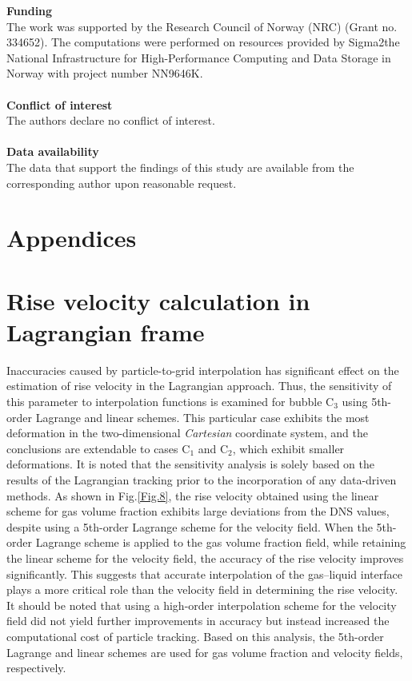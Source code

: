 \documentclass[a4paper,fleqn]{cas-sc}
\begin{document}
	
	{\noindent \bf{Funding}} \\
	
	The work was supported by the Research Council of Norway (NRC) (Grant no. 334652). The computations were performed on resources provided by Sigma2\textemdash the National Infrastructure for High-Performance Computing and Data Storage in Norway with project number NN9646K.\\
	\\
	{\bf{Conflict of interest}} \\
	
	The authors declare no conflict of interest. \\
	\\
	{\bf{Data availability}} \\
	

	The data that support the findings of this study are available from the corresponding author upon reasonable request. \\
	
	\section*{Appendices}
	
	\appendix
	
	\section{Rise velocity calculation in Lagrangian frame}
	\label{Append_A}
	
	
	Inaccuracies caused by particle-to-grid interpolation has significant effect on the estimation of rise velocity in the Lagrangian approach. Thus, the sensitivity of this parameter to interpolation functions is examined for bubble C$_3$ using 5th-order Lagrange and linear schemes. This particular case exhibits the most deformation in the two-dimensional \textit{Cartesian} coordinate system, and the conclusions are extendable to cases C$_1$ and C$_2$, which exhibit smaller deformations. It is noted that the sensitivity analysis is solely based on the results of the Lagrangian tracking prior to the incorporation of any data-driven methods. As shown in Fig.\ref{Fig.8}, the rise velocity obtained using the linear scheme for gas volume fraction exhibits large deviations from the DNS values, despite using a 5th-order Lagrange scheme for the velocity field. When the 5th-order Lagrange scheme is applied to the gas volume fraction field, while retaining the linear scheme for the velocity field, the accuracy of the rise velocity improves significantly. This suggests that accurate interpolation of the gas–liquid interface plays a more critical role than the velocity field in determining the rise velocity. It should be noted that using a high-order interpolation scheme for the velocity field did not yield further improvements in accuracy but instead increased the computational cost of particle tracking. Based on this analysis, the 5th-order Lagrange and linear schemes are used for gas volume fraction and velocity fields, respectively. 
	
\end{document}
